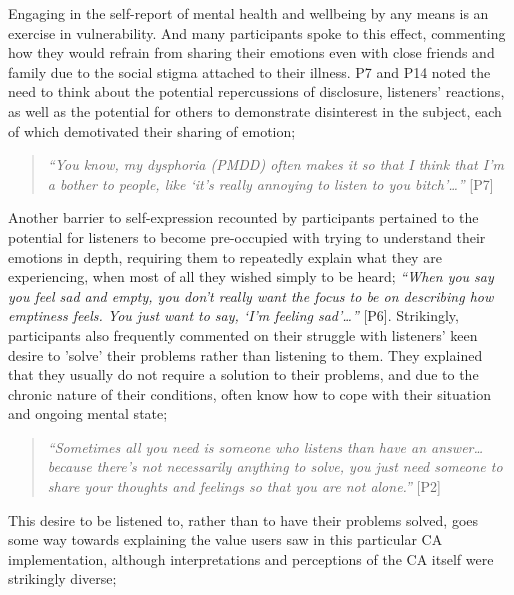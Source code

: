         Engaging in the self-report of mental health and wellbeing by any means is an exercise in vulnerability. And many participants spoke to this effect, commenting how they would refrain from sharing their emotions even with close friends and family due to the social stigma attached to their illness. P7 and P14 noted the need to think about the potential repercussions of disclosure, listeners' reactions, as well as the potential for others to demonstrate disinterest in the subject, each of which demotivated their sharing of emotion;
    
            \begin{quote}
            \vspace{2mm}
                \textit{``You know, my dysphoria (\ac{PMDD}) often makes it so that I think that I'm a bother to people, like `it's really annoying to listen to you bitch'\ldots''} [P7]
            \vspace{2mm}
            \end{quote}  
    
        Another barrier to self-expression recounted by participants pertained to the potential for listeners to become pre-occupied with trying to understand their emotions in depth, requiring them to repeatedly explain what they are experiencing, when most of all they wished simply to be heard; \textit{``When you say you feel sad and empty, you don't really want the focus to be on describing how emptiness feels. You just want to say, `I'm feeling sad'\ldots''} [P6]. Strikingly, participants also frequently commented on their struggle with listeners' keen desire to 'solve' their problems rather than listening to them. They explained that they usually do not require a solution to their problems, and due to the chronic nature of their conditions, often know how to cope with their situation and ongoing mental state; 
        
            \begin{quote}
            \vspace{2mm}
                \textit{``Sometimes all you need is someone who listens than have an answer\ldots because there's not necessarily anything to solve, you just need someone to share your thoughts and feelings so that you are not alone.''} [P2]
            \vspace{2mm}
            \end{quote}  
        
        This desire to be listened to, rather than to have their problems solved, goes some way towards explaining the value users saw in this particular \ac{CA} implementation, although interpretations and perceptions of the CA itself were strikingly diverse;
        
